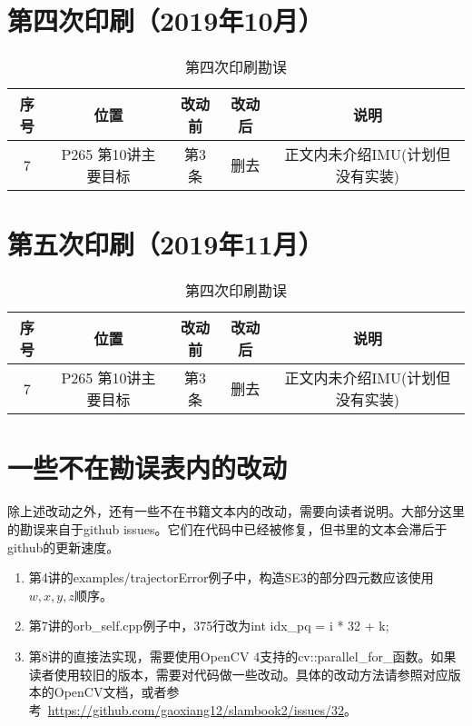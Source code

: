 \documentclass[lang=cn,11pt,numbers]{errata}
\begin{document}
\section{第四次印刷（2019年10月）}
\begin{table}[!htp]
	\centering
	\caption{第四次印刷勘误}
	\begin{tabular}{c|cccc}
		\hline\hline
		序号 & 位置 & 改动前 & 改动后 & 说明 \\\hline
		7 & P265 第10讲主要目标 & 第3条 & 删去 & 正文内未介绍IMU(计划但没有实装) \\
		\hline \hline
	\end{tabular}
\end{table}

\section{第五次印刷（2019年11月）}
\begin{table}[!htp]
	\centering
	\caption{第四次印刷勘误}
	\begin{tabular}{c|cccc}
		\hline\hline
		序号 & 位置 & 改动前 & 改动后 & 说明 \\\hline
		7 & P265 第10讲主要目标 & 第3条 & 删去 & 正文内未介绍IMU(计划但没有实装) \\
		\hline \hline
	\end{tabular}
\end{table}

\section{一些不在勘误表内的改动}
除上述改动之外，还有一些不在书籍文本内的改动，需要向读者说明。大部分这里的勘误来自于github issues。它们在代码中已经被修复，但书里的文本会滞后于github的更新速度。

\begin{enumerate}
	\item 第4讲的examples/trajectorError例子中，构造SE3的部分四元数应该使用$w,x,y,z$顺序。
	\item 第7讲的orb\_self.cpp例子中，375行改为int idx\_pq = i * 32 + k;
	\item 第8讲的直接法实现，需要使用OpenCV 4支持的cv::parallel\_for\_函数。如果读者使用较旧的版本，需要对代码做一些改动。具体的改动方法请参照对应版本的OpenCV文档，或者参考~\url{https://github.com/gaoxiang12/slambook2/issues/32}。

\end{enumerate}
\end{document}

